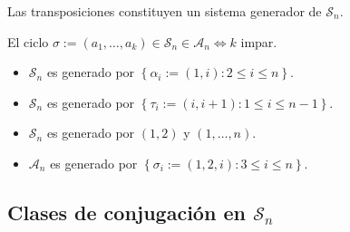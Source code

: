 \begin{lema}
Las transposiciones constituyen un sistema generador de $\mathcal{S}_n$.
\end{lema}

\begin{prop}
El ciclo $\sigma := \left( a_1, \ldots, a_k \right) \in \mathcal{S}_n \in \mathcal{A}_n \Leftrightarrow k$ impar.
\end{prop}

\begin{prop}
\begin{itemize}
\item $\mathcal{S}_n$ es generado por $\left\{ \alpha_i := \left( 1, i \right): 2 \le i \le n \right\}$.
\item $\mathcal{S}_n$ es generado por $\left\{ \tau_i := \left( i, i+1 \right) : 1 \le i \le n-1 \right\}$.
\item $\mathcal{S}_n$ es generado por $\left( 1, 2 \right)$ y $\left( 1, \ldots, n \right)$.
\item $\mathcal{A}_n$ es generado por $\left\{ \sigma_i := \left( 1, 2, i \right) : 3 \le i \le n \right\}$.
\end{itemize} 
\end{prop}

\subsection{Clases de conjugación en $\mathcal{S}_n$}
